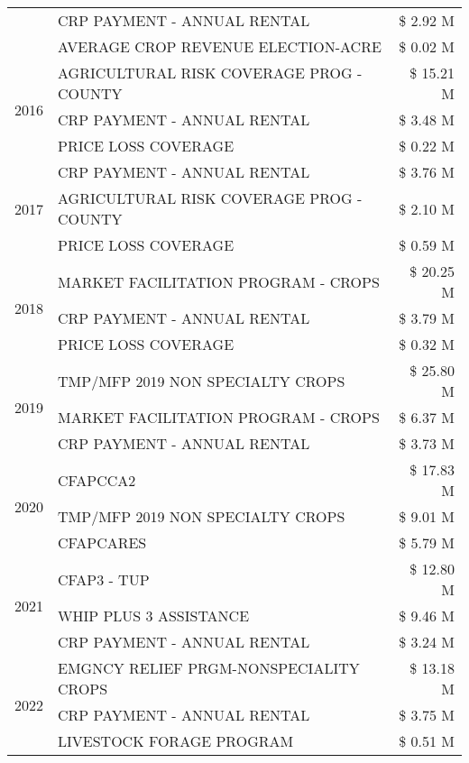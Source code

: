 \begin{tabular}{llr}
 & CRP PAYMENT - ANNUAL RENTAL & \$ 2.92 M \\
 & AVERAGE CROP REVENUE ELECTION-ACRE & \$ 0.02 M \\
\cline{1-3}
\multirow[t]{3}{*}{2016} & AGRICULTURAL RISK COVERAGE PROG - COUNTY & \$ 15.21 M \\
 & CRP PAYMENT - ANNUAL RENTAL & \$ 3.48 M \\
 & PRICE LOSS COVERAGE & \$ 0.22 M \\
\cline{1-3}
\multirow[t]{3}{*}{2017} & CRP PAYMENT - ANNUAL RENTAL & \$ 3.76 M \\
 & AGRICULTURAL RISK COVERAGE PROG - COUNTY & \$ 2.10 M \\
 & PRICE LOSS COVERAGE & \$ 0.59 M \\
\cline{1-3}
\multirow[t]{3}{*}{2018} & MARKET FACILITATION PROGRAM - CROPS & \$ 20.25 M \\
 & CRP PAYMENT - ANNUAL RENTAL & \$ 3.79 M \\
 & PRICE LOSS COVERAGE & \$ 0.32 M \\
\cline{1-3}
\multirow[t]{3}{*}{2019} & TMP/MFP 2019 NON SPECIALTY CROPS & \$ 25.80 M \\
 & MARKET FACILITATION PROGRAM - CROPS & \$ 6.37 M \\
 & CRP PAYMENT - ANNUAL RENTAL & \$ 3.73 M \\
\cline{1-3}
\multirow[t]{3}{*}{2020} & CFAPCCA2 & \$ 17.83 M \\
 & TMP/MFP 2019 NON SPECIALTY CROPS & \$ 9.01 M \\
 & CFAPCARES & \$ 5.79 M \\
\cline{1-3}
\multirow[t]{3}{*}{2021} & CFAP3 - TUP & \$ 12.80 M \\
 & WHIP PLUS 3 ASSISTANCE & \$ 9.46 M \\
 & CRP PAYMENT - ANNUAL RENTAL & \$ 3.24 M \\
\cline{1-3}
\multirow[t]{3}{*}{2022} & EMGNCY RELIEF PRGM-NONSPECIALITY CROPS & \$ 13.18 M \\
 & CRP PAYMENT - ANNUAL RENTAL & \$ 3.75 M \\
 & LIVESTOCK FORAGE PROGRAM & \$ 0.51 M \\
\cline{1-3}
\bottomrule
\end{tabular}
